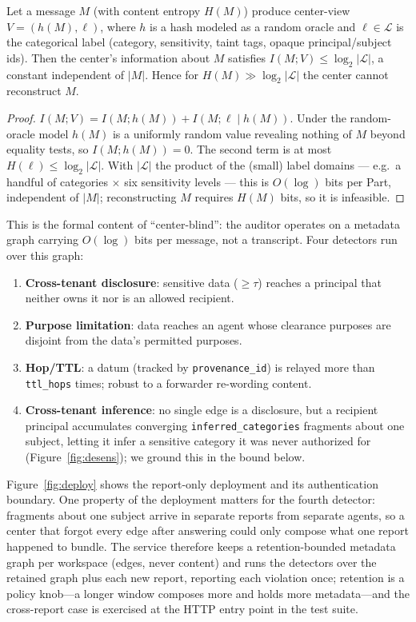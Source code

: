 \documentclass[sigconf,anonymous,review]{acmart}
\theoremstyle{acmplain}
\begin{document}
\begin{lemma}\label{lem:blind}
Let a message $M$ (with content entropy $H(M)$) produce center-view
$V=(h(M),\ell)$, where $h$ is a hash modeled as a random oracle and
$\ell\in\mathcal{L}$ is the categorical label (category, sensitivity, taint tags,
opaque principal/subject ids). Then the center's information about $M$ satisfies
$I(M;V)\le \log_2|\mathcal{L}|$, a constant independent of $|M|$. Hence for
$H(M)\gg\log_2|\mathcal{L}|$ the center cannot reconstruct $M$.
\end{lemma}
\begin{proof}
$I(M;V)=I(M;h(M))+I(M;\ell\mid h(M))$. Under the random-oracle model $h(M)$ is a
uniformly random value revealing nothing of $M$ beyond equality tests, so
$I(M;h(M))=0$. The second term is at most $H(\ell)\le\log_2|\mathcal{L}|$. With
$|\mathcal{L}|$ the product of the (small) label domains --- e.g.\ a handful of
categories $\times$ six sensitivity levels --- this is $O(\log)$ bits per Part,
independent of $|M|$; reconstructing $M$ requires $H(M)$ bits, so it is infeasible.
\end{proof}


This is the formal content of ``center-blind'': the auditor operates on a metadata
graph carrying $O(\log)$ bits per message, not a transcript. Four detectors run
over this graph:
\begin{enumerate}
\item \textbf{Cross-tenant disclosure}: sensitive data ($\geq\tau$) reaches a
principal that neither owns it nor is an allowed recipient.
\item \textbf{Purpose limitation}: data reaches an agent whose clearance purposes
are disjoint from the data's permitted purposes.
\item \textbf{Hop/TTL}: a datum (tracked by \texttt{provenance\_id}) is relayed
more than \texttt{ttl\_hops} times; robust to a forwarder re-wording content.
\item \textbf{Cross-tenant inference}: no single edge is a disclosure, but a
recipient principal accumulates converging \texttt{inferred\_categories}
fragments about one subject, letting it infer a sensitive category it was never
authorized for (Figure~\ref{fig:desens}); we ground this in the bound below.
\end{enumerate}
Figure~\ref{fig:deploy} shows the report-only deployment and its authentication boundary. One property of the deployment matters for the fourth detector: fragments about one subject arrive in separate reports from separate agents, so a center that forgot every edge after answering could only compose what one report happened to bundle. The service therefore keeps a retention-bounded metadata graph per workspace (edges, never content) and runs the detectors over the retained graph plus each new report, reporting each violation once; retention is a policy knob---a longer window composes more and holds more metadata---and the cross-report case is exercised at the HTTP entry point in the test suite.

\end{document}
